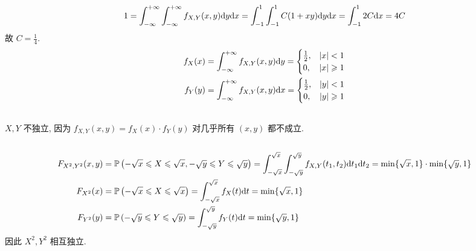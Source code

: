 \documentclass[8pt]{article}
\theoremstyle{compact}
\def\le{\leqslant}
\def\ge{\geqslant}
\def\P#1{\mathbb{P}\left({#1}\right)}
\begin{document}
\section{}
\subsection{}
	\begin{equation}
		1 = \int_{-\infty}^{+\infty}\int_{-\infty}^{+\infty}f_{X, Y}(x, y)\text dy \text dx = \int_{-1}^{1}\int_{-1}^{1}C(1 + xy)\text dy \text dx = \int_{-1}^{1}2C\text dx = 4C
	\end{equation}
	故 $C = \frac14$.
	\begin{equation}
		\begin{split}
			f_X(x) = \int_{-\infty}^{+\infty}f_{X, Y}(x, y)\text dy = \begin{cases}
				\frac12, & |x| < 1\\
				0, & |x| \ge 1
			\end{cases}\\
			f_Y(y) = \int_{-\infty}^{+\infty}f_{X, Y}(x, y)\text dx = \begin{cases}
				\frac12, & |y| < 1\\
				0, & |y| \ge 1
			\end{cases}
		\end{split}
	\end{equation}
	\subsection{} $X, Y$ 不独立, 因为 $f_{X, Y}(x, y) = f_X(x) \cdot f_Y(y)$ 对几乎所有 $(x, y)$ 都不成立.
	\subsection{}
	\begin{equation}
		\begin{split}
			F_{X^2, Y^2}(x, y) &= \P{-\sqrt x \le X \le \sqrt x, -\sqrt y \le Y \le \sqrt y} = \int_{-\sqrt x}^{\sqrt x}\int_{-\sqrt y}^{\sqrt y}f_{X, Y}(t_1, t_2)\text dt_1 \text dt_2 = \min\{\sqrt x, 1\} \cdot \min\{\sqrt y, 1\}\\
			F_{X^2}(x) &= \P{-\sqrt x \le X \le \sqrt x} = \int_{-\sqrt x}^{\sqrt x}f_X(t)\text dt = \min\{\sqrt x, 1\}\\
			F_{Y^2}(y) &= \P{-\sqrt y \le Y \le \sqrt y} = \int_{-\sqrt y}^{\sqrt y}f_Y(t)\text dt = \min\{\sqrt y, 1\}
		\end{split}
	\end{equation}
	因此 $X^2, Y^2$ 相互独立.
\end{document}
